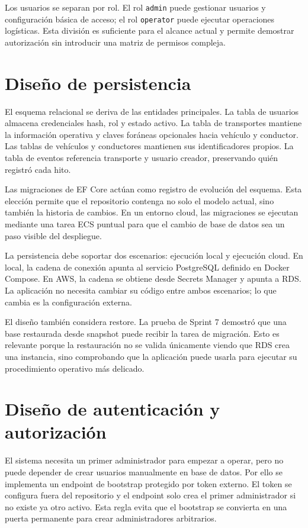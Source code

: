 Los usuarios se separan por rol. El rol \texttt{admin} puede gestionar usuarios y configuración básica de acceso; el rol \texttt{operator} puede ejecutar operaciones logísticas. Esta división es suficiente para el alcance actual y permite demostrar autorización sin introducir una matriz de permisos compleja.

\section{Diseño de persistencia}
\label{sec:diseno-persistencia-detallado}

El esquema relacional se deriva de las entidades principales. La tabla de usuarios almacena credenciales hash, rol y estado activo. La tabla de transportes mantiene la información operativa y claves foráneas opcionales hacia vehículo y conductor. Las tablas de vehículos y conductores mantienen sus identificadores propios. La tabla de eventos referencia transporte y usuario creador, preservando quién registró cada hito.

Las migraciones de EF Core actúan como registro de evolución del esquema. Esta elección permite que el repositorio contenga no solo el modelo actual, sino también la historia de cambios. En un entorno cloud, las migraciones se ejecutan mediante una tarea ECS puntual para que el cambio de base de datos sea un paso visible del despliegue.

La persistencia debe soportar dos escenarios: ejecución local y ejecución cloud. En local, la cadena de conexión apunta al servicio PostgreSQL definido en Docker Compose. En AWS, la cadena se obtiene desde Secrets Manager y apunta a RDS. La aplicación no necesita cambiar su código entre ambos escenarios; lo que cambia es la configuración externa.

El diseño también considera restore. La prueba de Sprint 7 demostró que una base restaurada desde snapshot puede recibir la tarea de migración. Esto es relevante porque la restauración no se valida únicamente viendo que RDS crea una instancia, sino comprobando que la aplicación puede usarla para ejecutar su procedimiento operativo más delicado.

\section{Diseño de autenticación y autorización}
\label{sec:diseno-auth}

El sistema necesita un primer administrador para empezar a operar, pero no puede depender de crear usuarios manualmente en base de datos. Por ello se implementa un endpoint de bootstrap protegido por token externo. El token se configura fuera del repositorio y el endpoint solo crea el primer administrador si no existe ya otro activo. Esta regla evita que el bootstrap se convierta en una puerta permanente para crear administradores arbitrarios.

